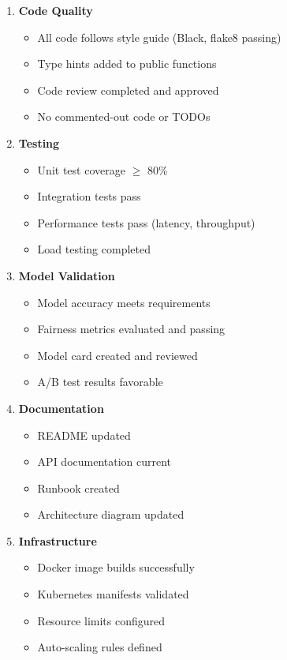 \begin{enumerate}
    \item \textbf{Code Quality}
    \begin{itemize}
        \item[ ] All code follows style guide (Black, flake8 passing)
        \item[ ] Type hints added to public functions
        \item[ ] Code review completed and approved
        \item[ ] No commented-out code or TODOs
    \end{itemize}

    \item \textbf{Testing}
    \begin{itemize}
        \item[ ] Unit test coverage $\geq$ 80\%
        \item[ ] Integration tests pass
        \item[ ] Performance tests pass (latency, throughput)
        \item[ ] Load testing completed
    \end{itemize}

    \item \textbf{Model Validation}
    \begin{itemize}
        \item[ ] Model accuracy meets requirements
        \item[ ] Fairness metrics evaluated and passing
        \item[ ] Model card created and reviewed
        \item[ ] A/B test results favorable
    \end{itemize}

    \item \textbf{Documentation}
    \begin{itemize}
        \item[ ] README updated
        \item[ ] API documentation current
        \item[ ] Runbook created
        \item[ ] Architecture diagram updated
    \end{itemize}

    \item \textbf{Infrastructure}
    \begin{itemize}
        \item[ ] Docker image builds successfully
        \item[ ] Kubernetes manifests validated
        \item[ ] Resource limits configured
        \item[ ] Auto-scaling rules defined
    \end{itemize}


\end{enumerate}
